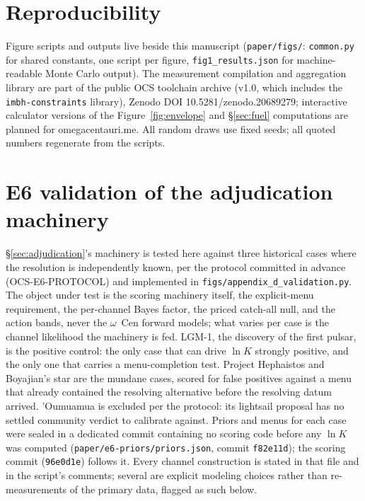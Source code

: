 \documentclass[11pt]{article}
\newcommand{\ocen}{\ensuremath{\omega}~Cen}
\newcommand{\lnK}{\ensuremath{\ln K}}
\begin{document}
\section{Reproducibility}
\label{app:repro}

Figure scripts and outputs live beside this manuscript (\texttt{paper/figs/}: \texttt{common.py} for shared constants, one script per figure, \texttt{fig1\_results.json} for machine-readable Monte Carlo output). The measurement compilation and aggregation library are part of the public OCS toolchain archive (v1.0, which includes the \texttt{imbh-constraints} library), Zenodo DOI 10.5281/zenodo.20689279; interactive calculator versions of the Figure~\ref{fig:envelope} and \S\ref{sec:fuel} computations are planned for omegacentauri.me. All random draws use fixed seeds; all quoted numbers regenerate from the scripts.

\section{E6 validation of the adjudication machinery}
\label{app:e6}

\S\ref{sec:adjudication}'s machinery is tested here against three historical cases where the resolution is independently known, per the protocol committed in advance (OCS-E6-PROTOCOL) and implemented in \texttt{figs/appendix\_d\allowbreak\_validation.py}. The object under test is the scoring machinery itself, the explicit-menu requirement, the per-channel Bayes factor, the priced catch-all null, and the action bands, never the \ocen{} forward models; what varies per case is the channel likelihood the machinery is fed. LGM-1, the discovery of the first pulsar, is the positive control: the only case that can drive $\lnK$ strongly positive, and the only one that carries a menu-completion test. Project Hephaistos and Boyajian's star are the mundane cases, scored for false positives against a menu that already contained the resolving alternative before the resolving datum arrived. 'Oumuamua is excluded per the protocol: its lightsail proposal has no settled community verdict to calibrate against. Priors and menus for each case were sealed in a dedicated commit containing no scoring code before any $\lnK$ was computed (\texttt{paper/e6-priors/priors.json}, commit \texttt{f82e11d}); the scoring commit (\texttt{96e0d1e}) follows it. Every channel construction is stated in that file and in the script's comments; several are explicit modeling choices rather than re-measurements of the primary data, flagged as such below.
\end{document}
